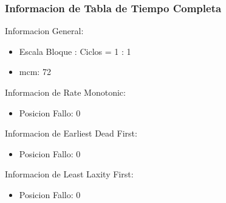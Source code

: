 \documentclass[xcolor=table]{beamer}
\begin{document}
\begin{frame} 
\frametitle{Informacion de Tabla de Tiempo Completa} 
Informacion General:\\ 
\begin{itemize} 
\item Escala Bloque : Ciclos = 1 : 1 \\ 
\item mcm:  72 \\ 
\end{itemize} 
Informacion de Rate Monotonic:\\ 
\begin{itemize} 
\item Posicion Fallo:  0 \\ 
\end{itemize} 
Informacion de Earliest Dead First:\\ 
\begin{itemize} 
\item Posicion Fallo:  0 \\ 
\end{itemize} 
Informacion de Least Laxity First:\\ 
\begin{itemize} 
\item Posicion Fallo:  0 \\ 
\end{itemize} 
\end{frame} 

\end{document}
